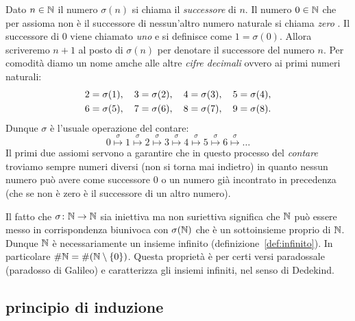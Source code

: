 Dato $n\in {\mathbb N}$ il numero $\sigma(n)$ si chiama il \emph{successore}%
%
 di $n$. 
Il numero $0\in {\mathbb N}$ che per assioma non è il successore di nessun'altro 
numero naturale si chiama \emph{zero}%
%
. 
Il successore di $0$ viene chiamato \emph{uno} e si definisce 
come $1=\sigma(0)$. 
Allora scriveremo $n+1$ al posto di $\sigma(n)$ per denotare 
il successore del numero $n$.
Per comodità diamo un nome amche alle altre \emph{cifre decimali}%
%
ovvero ai primi numeri naturali:
\begin{equation}\label{eq:cifre}
\begin{gathered}
 2 = \sigma(1),\quad
 3 = \sigma(2),\quad 
 4 = \sigma(3),\quad
 5 = \sigma(4),\\ 
 6 = \sigma(5),\quad 
 7 = \sigma(6),\quad 
 8 = \sigma(7),\quad 
 9 = \sigma(8).
\end{gathered}
\end{equation}
Dunque $\sigma$ è l'usuale operazione del contare:
 \[
 0 \stackrel\sigma\mapsto 1 \stackrel\sigma\mapsto 2 \stackrel\sigma\mapsto 
 3 \stackrel\sigma\mapsto 4 \stackrel\sigma\mapsto 5 \stackrel\sigma\mapsto 
 6 \stackrel\sigma\mapsto \dots  
 \]
Il primi due assiomi servono a garantire che in questo processo del \emph{contare}%
%
troviamo sempre numeri diversi (non si torna mai indietro) in quanto nessun numero 
può avere come successore $0$ o un numero già incontrato in precedenza (che 
se non è zero è il successore di un altro numero).

Il fatto che $\sigma\colon {\mathbb N}\to {\mathbb N}$ sia iniettiva ma non suriettiva 
significa che ${\mathbb N}$ può essere messo in corrispondenza biunivoca con 
$\sigma({\mathbb N})$ che è un sottoinsieme proprio di ${\mathbb N}$.
Dunque ${\mathbb N}$ è necessariamente un insieme infinito 
(definizione~\ref{def:infinito}).
In particolare $\#{\mathbb N} = \#{\left( {\mathbb N} \setminus{\left\{ 0 \right\}} \right)}$.
Questa proprietà è per certi versi paradossale
(paradosso di Galileo)
%
%
e caratterizza gli 
insiemi infiniti, nel senso di Dedekind.%
%

\subsection{principio di induzione}


